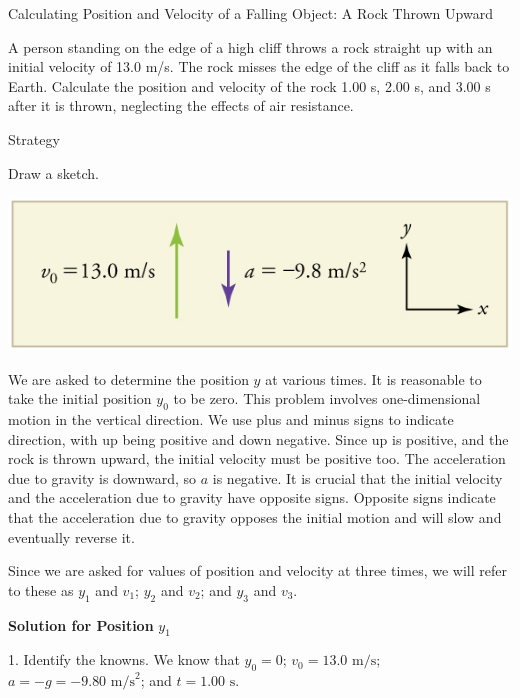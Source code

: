 \documentclass[
]{book}
\newenvironment{tinysection}{}{}
\begin{document}
\hypertarget{fs-id4067058}{}
Calculating Position and Velocity of a Falling Object: A Rock Thrown
Upward

A person standing on the edge of a high cliff throws a rock straight up
with an initial velocity of 13.0 m/s. The rock misses the edge of the
cliff as it falls back to Earth. Calculate the position and velocity of
the rock 1.00 s, 2.00 s, and 3.00 s after it is thrown, neglecting the
effects of air resistance.

\begin{tinysection}

{Strategy}

\end{tinysection}

Draw a sketch.

\includegraphics{images/Figure_02_07_00b.jpg}

We are asked to determine the position \(y{}\) at various times. It is
reasonable to take the initial position \(y_{0}{}\) to be zero. This
problem involves one-dimensional motion in the vertical direction. We
use plus and minus signs to indicate direction, with up being positive
and down negative. Since up is positive, and the rock is thrown upward,
the initial velocity must be positive too. The acceleration due to
gravity is downward, so \(a{}\) is negative. It is crucial that the
initial velocity and the acceleration due to gravity have opposite
signs. Opposite signs indicate that the acceleration due to gravity
opposes the initial motion and will slow and eventually reverse it.

Since we are asked for values of position and velocity at three times,
we will refer to these as \(y_{1}{}\) and \(v_{1}{}\); \emph{\(y_{2}{}\)} and
\(v_{2}{}\); and \(y_{3}{}\) and \(v_{3}{}\).

\textbf{Solution for Position} \(y_{1}{}\)

1. Identify the knowns. We know that \({y_{0} = 0}{}\);
\({{v_{0} = \text{13}}\text{.}\text{0\ m/s}}{}\);
\({{{a = {- g}} = {- 9}}\text{.}\text{80\ m/s}^{2}}{}\); and
\({{t = 1}\text{.}\text{00\ s}}{}\).
\end{document}
